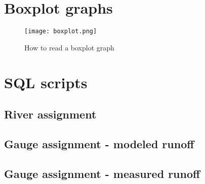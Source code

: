 \appendix
\chapter{Boxplot graphs}
\label{app:boxplot}

\begin{figure}[H]
\centering
\texttt{[image: boxplot.png]}
\caption[How to read a boxplot graph]{How to read a boxplot graph \cite{stk_boxplot}}
\label{boxlot}
\end{figure}

\chapter{SQL scripts}
\section{River assignment}
\label{app:sql_assign_river}




\section{Gauge assignment - modeled runoff}
\label{app:sql_assign_watergap}




\section{Gauge assignment - measured runoff}
\label{app:sql_assign_gauge}

